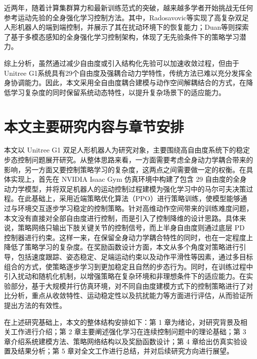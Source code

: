 近两年，随着计算集群算力和最新训练范式的突破，越来越多学者开始挑战无任何参考运动先验的全身强化学习控制方法。其中，Radosavovic等\cite{Radosavovic2023}实现了高复杂双足人形机器人的端到端控制，并展示了其在扰动环境下的恢复能力；Duan等\cite{Duan2024}则探索了基于多模态感知的全身强化学习控制架构，体现了无先验条件下的策略学习潜力。

综上分析，虽然通过减少自由度或引入结构化先验可以加速收敛过程，但由于Unitree G1系统具有29个自由度及强耦合动力学特性，传统方法已难以充分发挥全身协调能力。因此，本文采用全自由度耦合建模与动作空间解耦结合的方式，在降低学习复杂度的同时保留系统动态特性，以提升复杂场景下的适应能力。  

\section{本文主要研究内容与章节安排}
本文以 Unitree G1 双足人形机器人为研究对象，主要围绕高自由度系统下的稳定步态控制问题展开研究。从整体思路来看，一方面需要考虑全身动力学耦合带来的影响，另一方面又要控制策略学习的复杂度，这两点之间需要做一定的权衡。在具体实现上，首先在 NVIDIA Isaac Gym 仿真环境中构建了包含 29 自由度的全身动力学模型，并将双足机器人的运动控制过程建模为强化学习中的马尔可夫决策过程。在此基础上，采用近端策略优化算法（PPO）进行策略训练，使模型能够通过与环境交互逐步学习稳定的控制策略。针对高维动作空间带来的训练难度问题，本文没有直接对全部自由度进行控制，而是引入了控制降维的设计思路。具体来说，策略网络只输出下肢关键关节的控制信号，而上半身自由度则通过底层 PD 控制器进行约束。这样一来，在保留全身动力学耦合特性的同时，也在一定程度上降低了策略学习的复杂度。在奖励函数设计方面，本文从多个角度对策略进行引导，包括速度跟踪、姿态稳定、足端运动约束以及动作平滑性等因素，通过多目标组合的方式，使策略逐步学习到更加稳定且自然的步态行为。同时，在训练过程中引入扰动和随机化机制，以增强策略在复杂环境和非理想条件下的适应能力。在实验部分，基于大规模并行仿真环境，对不同自由度建模方式下的控制策略进行了对比分析，重点从收敛特性、运动稳定性以及抗扰能力等方面进行评估，从而验证所提出方法的有效性。

在上述研究基础上，本文的整体结构安排如下：第 1 章为绪论，对研究背景及相关工作进行介绍；第 2 章主要阐述强化学习在连续控制问题中的理论基础；第 3 章介绍系统建模方法、策略网络结构以及奖励函数设计；第 4 章给出仿真实验设置及结果分析；第 5 章对全文工作进行总结，并对后续研究方向进行展望。
